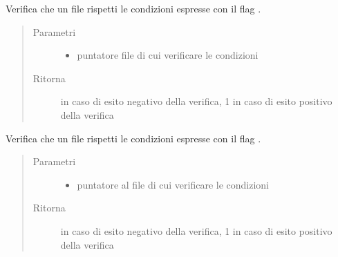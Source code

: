 \documentclass[letterpaper,10pt,italian,openany,oneside]{sphinxmanual}
\begin{document}

\begin{fulllineitems}
\label{\detokenize{documentazione:c.checkUID}}
Verifica che un file rispetti le condizioni espresse con il flag .
\begin{quote}\begin{description}
\item[{Parametri}] \leavevmode\begin{itemize}
\item {} 
 \textendash{} puntatore file di cui verificare le condizioni

\end{itemize}

\item[{Ritorna}]  in caso di esito negativo della verifica, 1 in caso di esito positivo della verifica

\end{description}\end{quote}

\end{fulllineitems}


\begin{fulllineitems}
\label{\detokenize{documentazione:c.checkGID}}
Verifica che un file rispetti le condizioni espresse con il flag .
\begin{quote}\begin{description}
\item[{Parametri}] \leavevmode\begin{itemize}
\item {} 
 \textendash{} puntatore al file di cui verificare le condizioni

\end{itemize}

\item[{Ritorna}]  in caso di esito negativo della verifica, 1 in caso di esito positivo della verifica

\end{description}\end{quote}

\end{fulllineitems}
\end{document}
